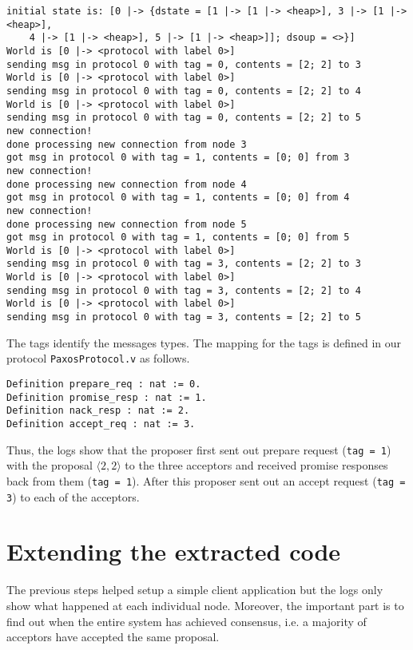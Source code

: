 \begin{lstlisting}
initial state is: [0 |-> {dstate = [1 |-> [1 |-> <heap>], 3 |-> [1 |-> <heap>],
    4 |-> [1 |-> <heap>], 5 |-> [1 |-> <heap>]]; dsoup = <>}]
World is [0 |-> <protocol with label 0>]
sending msg in protocol 0 with tag = 0, contents = [2; 2] to 3
World is [0 |-> <protocol with label 0>]
sending msg in protocol 0 with tag = 0, contents = [2; 2] to 4
World is [0 |-> <protocol with label 0>]
sending msg in protocol 0 with tag = 0, contents = [2; 2] to 5
new connection!
done processing new connection from node 3
got msg in protocol 0 with tag = 1, contents = [0; 0] from 3
new connection!
done processing new connection from node 4
got msg in protocol 0 with tag = 1, contents = [0; 0] from 4
new connection!
done processing new connection from node 5
got msg in protocol 0 with tag = 1, contents = [0; 0] from 5
World is [0 |-> <protocol with label 0>]
sending msg in protocol 0 with tag = 3, contents = [2; 2] to 3
World is [0 |-> <protocol with label 0>]
sending msg in protocol 0 with tag = 3, contents = [2; 2] to 4
World is [0 |-> <protocol with label 0>]
sending msg in protocol 0 with tag = 3, contents = [2; 2] to 5
\end{lstlisting}

The tags identify the messages types. The mapping for the tags is defined in
our protocol \texttt{PaxosProtocol.v} as follows.

\begin{lstlisting}
Definition prepare_req : nat := 0.
Definition promise_resp : nat := 1.
Definition nack_resp : nat := 2.
Definition accept_req : nat := 3.
\end{lstlisting}

Thus, the logs show that the proposer first sent out prepare request
(\texttt{tag = 1}) with the proposal $\langle 2, 2 \rangle$
to the three acceptors and received promise responses back from them (\texttt{tag = 1}).
After this proposer sent out an accept request (\texttt{tag = 3}) to each of
the acceptors.

\section{Extending the extracted code}
The previous steps helped setup a simple client application but the logs
only show what happened at each individual node. Moreover, the important part is
to find out when the entire system has achieved consensus, i.e. a majority of
acceptors have accepted the same proposal.

